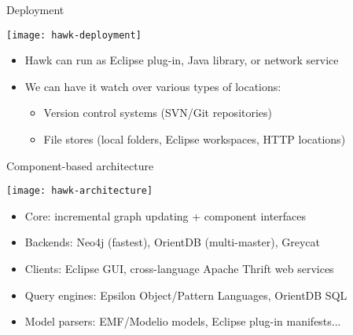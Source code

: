\begin{frame}{Deployment}

  \begin{center}
    \texttt{[image: hawk-deployment]}
  \end{center}

  \begin{itemize}
  \item Hawk can run as Eclipse plug-in, Java library, or network service
  \item We can have it watch over various types of locations:
    \begin{itemize}
    \item Version control systems (SVN/Git repositories)
    \item File stores (local folders, Eclipse workspaces, HTTP locations)
    \end{itemize}
  \end{itemize}

\end{frame}

\begin{frame}{Component-based architecture}
  \begin{center}
    \texttt{[image: hawk-architecture]}
  \end{center}

  \begin{itemize}
  \item Core: incremental graph updating + component interfaces
  \item Backends: Neo4j (fastest), OrientDB (multi-master), Greycat
  \item Clients: Eclipse GUI, cross-language Apache Thrift web services
  \item Query engines: Epsilon Object/Pattern Languages, OrientDB SQL
  \item Model parsers: EMF/Modelio models, Eclipse plug-in manifests...
  \end{itemize}
\end{frame}

